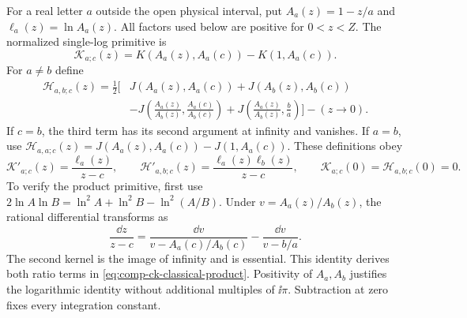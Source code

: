 For a real letter $a$ outside the open physical interval, put
$A_a(z)=1-z/a$ and $\ell_a(z)=\ln A_a(z)$.  All factors used below
are positive for $0<z<Z$.  The normalized single-log primitive is
\begin{equation}
 \mathcal K_{a;c}(z)
 =K(A_a(z),A_a(c))-K(1,A_a(c)).
\end{equation}
For $a\ne b$ define
\begin{equation}
 \begin{aligned}
 \mathcal H_{a,b;c}(z)=\frac12\bigg[&
 J(A_a(z),A_a(c))+J(A_b(z),A_b(c))\\
 &-J\left(\frac{A_a(z)}{A_b(z)},
                 \frac{A_a(c)}{A_b(c)}\right)
 +J\left(\frac{A_a(z)}{A_b(z)},\frac ba\right)\bigg]
 -(z\to0).
 \end{aligned}
 \label{eq:comp-ck-classical-product}
\end{equation}
If $c=b$, the third term has its second argument at infinity and
vanishes.  If $a=b$, use
$\mathcal H_{a,a;c}(z)=J(A_a(z),A_a(c))-J(1,A_a(c))$.
These definitions obey
\begin{equation}
 \mathcal K'_{a;c}(z)=\frac{\ell_a(z)}{z-c},\qquad
 \mathcal H'_{a,b;c}(z)=\frac{\ell_a(z)\ell_b(z)}{z-c},\qquad
 \mathcal K_{a;c}(0)=\mathcal H_{a,b;c}(0)=0.
\end{equation}
To verify the product primitive, first use
$2\ln A\ln B=\ln^2A+\ln^2B-\ln^2(A/B)$.  Under
$v=A_a(z)/A_b(z)$, the rational differential transforms as
\begin{equation}
 \frac{\dd z}{z-c}
 =\frac{\dd v}{v-A_a(c)/A_b(c)}
  -\frac{\dd v}{v-b/a}.
\end{equation}
The second kernel is the image of infinity and is essential.
This identity derives both ratio terms in
\eqref{eq:comp-ck-classical-product}.  Positivity of $A_a,A_b$
justifies the logarithmic identity without additional multiples of
$\ii\pi$.  Subtraction at zero fixes every integration constant.

